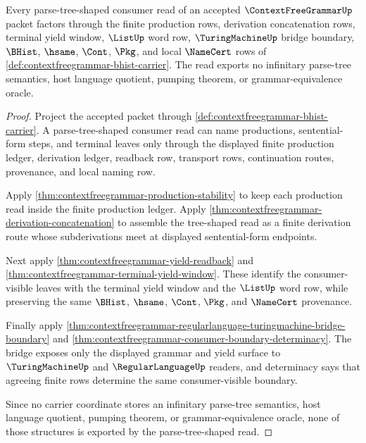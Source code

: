 \begin{theorem}
\label{thm:contextfreegrammar-parse-tree-derivation-boundary}
Every parse-tree-shaped consumer read of an accepted
$\ContextFreeGrammarUp$ packet factors through the finite production rows,
derivation concatenation rows, terminal yield window, $\ListUp$ word row,
$\TuringMachineUp$ bridge boundary, $\BHist$, $\hsame$, $\Cont$, $\Pkg$, and
local $\NameCert$ rows of \autoref{def:contextfreegrammar-bhist-carrier}. The
read exports no infinitary parse-tree semantics, host language quotient,
pumping theorem, or grammar-equivalence oracle.
\end{theorem}
\begin{proof}
Project the accepted packet through
\autoref{def:contextfreegrammar-bhist-carrier}. A parse-tree-shaped consumer
read can name productions, sentential-form steps, and terminal leaves only
through the displayed finite production ledger, derivation ledger, readback
row, transport rows, continuation routes, provenance, and local naming row.

Apply \autoref{thm:contextfreegrammar-production-stability} to keep each
production read inside the finite production ledger. Apply
\autoref{thm:contextfreegrammar-derivation-concatenation} to assemble the
tree-shaped read as a finite derivation route whose subderivations meet at
displayed sentential-form endpoints.

Next apply \autoref{thm:contextfreegrammar-yield-readback} and
\autoref{thm:contextfreegrammar-terminal-yield-window}. These identify the
consumer-visible leaves with the terminal yield window and the $\ListUp$ word
row, while preserving the same $\BHist$, $\hsame$, $\Cont$, $\Pkg$, and
$\NameCert$ provenance.

Finally apply
\autoref{thm:contextfreegrammar-regularlanguage-turingmachine-bridge-boundary}
and \autoref{thm:contextfreegrammar-consumer-boundary-determinacy}. The
bridge exposes only the displayed grammar and yield surface to
$\TuringMachineUp$ and $\RegularLanguageUp$ readers, and determinacy says
that agreeing finite rows determine the same consumer-visible boundary.

Since no carrier coordinate stores an infinitary parse-tree semantics, host
language quotient, pumping theorem, or grammar-equivalence oracle, none of
those structures is exported by the parse-tree-shaped read.
\end{proof}

